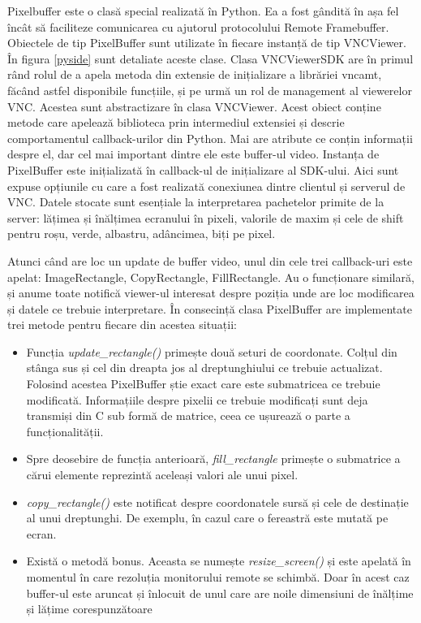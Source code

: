 Pixelbuffer este o clasă special realizată în Python. Ea a fost gândită în așa fel încât să faciliteze comunicarea cu ajutorul protocolului Remote Framebuffer. Obiectele de tip PixelBuffer sunt utilizate în fiecare instanță de tip VNCViewer. În figura \ref{pyside} sunt detaliate aceste clase. Clasa VNCViewerSDK
are în primul rând rolul de a apela metoda din extensie de inițializare a librăriei vncamt, făcând astfel disponibile funcțiile, și pe urmă un rol de management al viewerelor VNC. Acestea sunt abstractizare în clasa VNCViewer. Acest obiect conține metode care apelează biblioteca prin intermediul extensiei și descrie comportamentul callback-urilor din Python. Mai are atribute ce conțin informații despre el, dar cel mai important dintre ele este buffer-ul video. Instanța de PixelBuffer este inițializată în callback-ul de inițializare al SDK-ului. Aici sunt expuse opțiunile cu care a fost realizată conexiunea dintre clientul și serverul de VNC. Datele stocate sunt esențiale la interpretarea pachetelor primite de la server: lățimea și înălțimea ecranului în pixeli, valorile de maxim și cele de shift pentru roșu, verde, albastru, adâncimea, biți pe pixel.

Atunci când are loc un update de buffer video, unul din cele trei callback-uri este apelat: ImageRectangle, CopyRectangle, FillRectangle. Au o funcționare similară, și anume toate notifică viewer-ul interesat despre poziția unde are loc modificarea și datele ce trebuie interpretare. În consecință clasa PixelBuffer are implementate trei metode pentru fiecare din acestea situații:

\begin{itemize}
  \item Funcția \textit{update\_rectangle()} primește două seturi de coordonate. Colțul din stânga sus și cel din dreapta jos al dreptunghiului ce trebuie actualizat. Folosind acestea PixelBuffer știe exact care este submatricea ce trebuie modificată. Informațiile despre pixelii ce trebuie modificați sunt deja transmiși din C sub formă de matrice, ceea ce ușurează o parte a funcționalității.
  \item Spre deosebire de funcția anterioară, \textit{fill\_rectangle} primește o submatrice a cărui elemente reprezintă aceleași valori ale unui pixel.
  \item \textit{copy\_rectangle()} este notificat despre coordonatele sursă și cele de destinație al unui dreptunghi. De exemplu, în cazul care o fereastră este mutată pe ecran.
  \item Există o metodă bonus. Aceasta se numește \textit{resize\_screen()} și este apelată în momentul în care rezoluția monitorului remote se schimbă. Doar în acest caz buffer-ul este aruncat și înlocuit de unul care are noile dimensiuni de înălțime și lățime corespunzătoare
\end{itemize}

